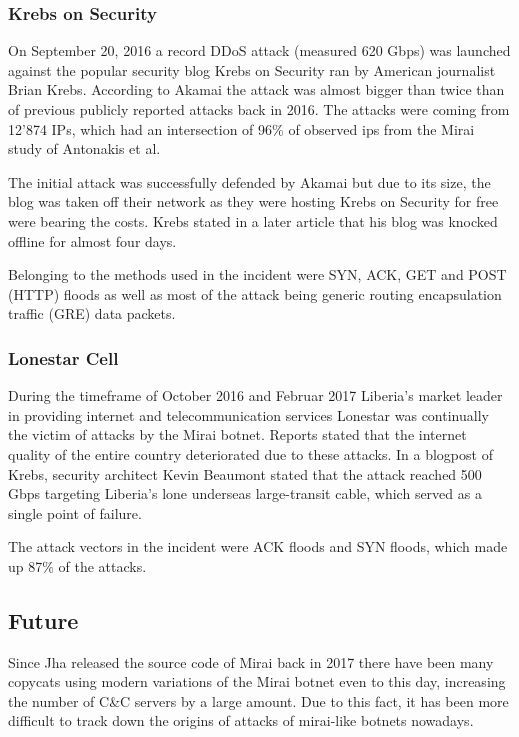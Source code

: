 		\subsubsection{Krebs on Security}
		On September 20, 2016 a record DDoS attack (measured 620 Gbps) was launched against the popular security blog Krebs on Security ran by American journalist Brian Krebs. According to Akamai the attack was almost bigger than twice than of previous publicly reported attacks back in 2016. \cite{Akamai16} The attacks were coming from 12'874 IPs, which had an intersection of 96\% of observed ips from the Mirai study of Antonakis et al. \cite{Antonakakis17}
	
The initial attack was successfully defended by Akamai but due to its size, the blog was taken off their network as they were hosting Krebs on Security for free were bearing the costs. \cite{Osborne16} Krebs stated in a later article that his blog was knocked offline for almost four days. \cite{Krebs19}

Belonging to the methods used in the incident were SYN, ACK, GET and POST (HTTP) floods as well as most of the attack being generic routing encapsulation traffic (GRE) data packets. \cite{Antonakakis17}

	
		\subsubsection{Lonestar Cell}
		During the timeframe of October 2016 and Februar 2017 Liberia's market leader in providing internet and telecommunication services Lonestar was continually the victim of attacks by the Mirai botnet. Reports stated that the internet quality of the entire country deteriorated due to these attacks. \cite{Antonakakis17} In a blogpost of Krebs, security architect Kevin Beaumont stated that the attack reached 500 Gbps targeting Liberia's lone underseas large-transit cable, which served as a single point of failure. \cite{Krebs16}
	
The attack vectors in the incident were ACK floods and SYN floods, which made up 87\% of the attacks. \cite{Antonakakis17}

	
	\subsection{Future}
Since Jha released the source code of Mirai back in 2017 there have been many copycats using modern variations of the Mirai botnet even to this day, increasing the number of C\&C servers by a large amount. Due to this fact, it has been more difficult to track down the origins of attacks of mirai-like botnets nowadays.

